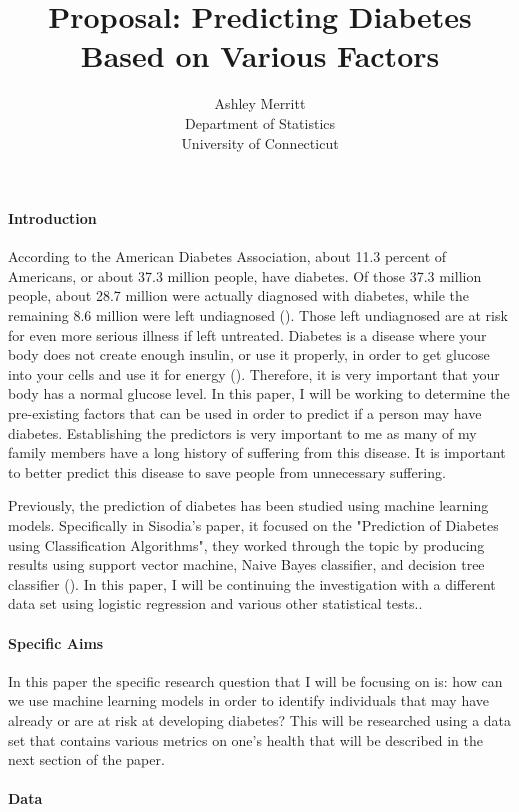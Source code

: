 \documentclass[12pt]{article}
\title{Proposal: Predicting Diabetes Based on Various Factors}
\author{Ashley Merritt\\
  Department of Statistics\\
  University of Connecticut
  }
\begin{document}
\maketitle

\paragraph{Introduction}
According to the American Diabetes Association, about 11.3 percent of Americans, or about 37.3 million people, have diabetes. Of those 37.3 million people, about 28.7 million were actually diagnosed with diabetes, while the remaining 8.6 million were left undiagnosed (\citet{CDC2022Diabetes}). Those left undiagnosed are at risk for even more serious illness if left untreated. Diabetes is a disease where your body does not create enough insulin, or use it properly, in order to get glucose into your cells and use it for energy (\cite{NIH2023Whatis}). Therefore, it is very important that your body has a normal glucose level. In this paper, I will be working to determine the pre-existing factors that can be used in order to predict if a person may have diabetes. Establishing the predictors is very important to me as many of my family members have a long history of suffering from this disease. It is important to better predict this disease to save people from unnecessary suffering. 

Previously, the prediction of diabetes has been studied using machine learning models. Specifically in Sisodia's paper, it focused on the "Prediction of Diabetes using Classification Algorithms", they worked through the topic by producing results using support vector machine, Naive Bayes classifier, and decision tree classifier (\cite{Sisodia2018Prediction}). In this paper, I will be continuing the investigation with a different data set using logistic regression and various other statistical tests.. 


\paragraph{Specific Aims}
In this paper the specific research question that I will be focusing on is: how can we use machine learning models in order to identify individuals that may have already or are at risk at developing diabetes? This will be researched using a data set that contains various metrics on one's health that will be described in the next section of the paper.


\paragraph{Data}
\end{document}
